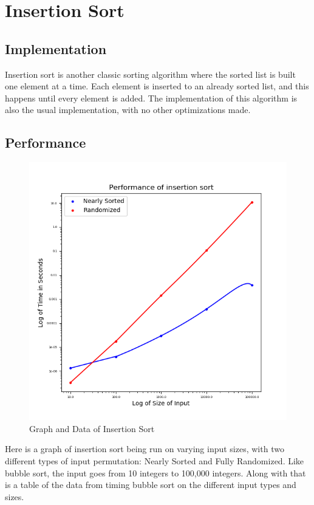 \documentclass{article}
\begin{document}
\section{Insertion Sort}
\subsection{Implementation}
    Insertion sort is another classic sorting algorithm where the sorted list is 
    built one element at a time. Each element is inserted to an already sorted
    list, and this happens until every element is added. The implementation of
    this algorithm is also the usual implementation, with no other optimizations
    made.
\subsection{Performance}
    \begin{figure}[H]
        \centering
        \includegraphics[scale=0.60]{"../images/insertion"}
        \caption{Graph and Data of Insertion Sort}
    \end{figure}
    Here is a graph of insertion sort being run on varying input sizes, with two
    different types of input permutation: Nearly Sorted and Fully Randomized.
    Like bubble sort, the input goes from 10 integers to 100,000 integers. Along 
    with that is a table of the data from timing bubble sort on the different 
    input types and sizes.
\end{document}
